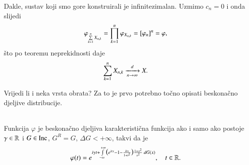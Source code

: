 Dakle, sustav koji smo gore konstruirali je infinitezimalan.
Uzmimo $c_n = 0$ i onda slijedi
\begin{equation*}
    \varphi_{\sum\limits_{k = 1}^{n} X_{n, k}} = \prod\limits_{k = 1}^{n} \varphi_{X_{n, k}} = [\varphi_n]^n = \varphi,
\end{equation*}
\v sto po teoremu neprekidnosti daje
\begin{equation}    \label{jed:20.15}
    \sum\limits_{k = 1}^{n} X_{n, k} \xrightarrow[n \to \infty]{d} X.
\end{equation}

Vrijedi li i neka vrsta obrata?
Za to je prvo potrebno to\v cno opisati beskona\v cno djeljive distribucije.

\begin{tm}   \label{tm:20.16}
    \quad \\
    Funkcija $\varphi$ je beskona\v cno djeljiva karakteristi\v cna funkcija ako i samo ako postoje $\gamma \in \mathbb{R}$ i $G \in \mathrm{Inc}$, $G^R = G$, $\Delta G < +\infty$, takvi da je
    \begin{equation*}
        \varphi (t) = e^{  i \gamma t + \int\limits_{-\infty}^{+\infty} \big(e^{itx} - 1 - \frac{itx}{1 + t^2} \big) \frac{1 + x^2}{x^2}  \: d G(x)}, \quad t \in \mathbb{R}.
    \end{equation*}
\end{tm}

